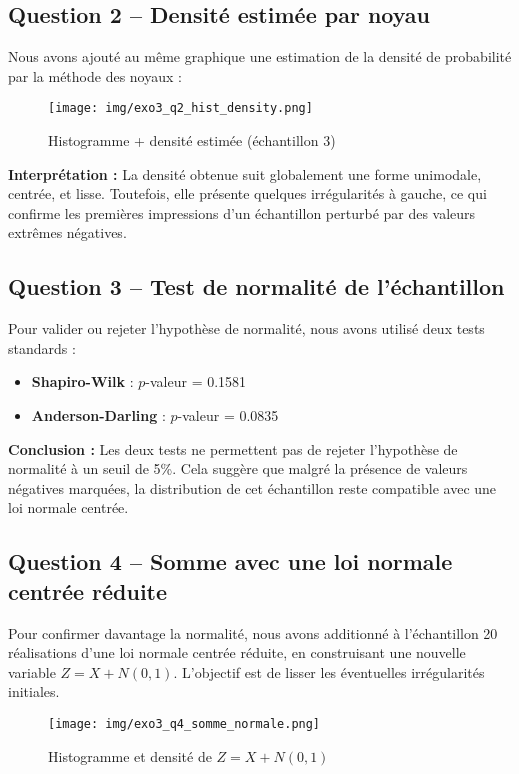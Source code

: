 \documentclass[a4paper,11pt]{article}
\begin{document}
\subsection*{Question 2 – Densité estimée par noyau}
Nous avons ajouté au même graphique une estimation de la densité de probabilité par la méthode des noyaux :

\begin{figure}[H]
    \centering
    \texttt{[image: img/exo3\_q2\_hist\_density.png]}
    \caption{Histogramme + densité estimée (échantillon 3)}
\end{figure}

\textbf{Interprétation :} La densité obtenue suit globalement une forme unimodale, centrée, et lisse. Toutefois, elle présente quelques irrégularités à gauche, ce qui confirme les premières impressions d’un échantillon perturbé par des valeurs extrêmes négatives.

\subsection*{Question 3 – Test de normalité de l’échantillon}
Pour valider ou rejeter l’hypothèse de normalité, nous avons utilisé deux tests standards :

\begin{itemize}
    \item \textbf{Shapiro-Wilk} : $p$-valeur = 0.1581
    \item \textbf{Anderson-Darling} : $p$-valeur = 0.0835
\end{itemize}

\textbf{Conclusion :} Les deux tests ne permettent pas de rejeter l’hypothèse de normalité à un seuil de 5\%. Cela suggère que malgré la présence de valeurs négatives marquées, la distribution de cet échantillon reste compatible avec une loi normale centrée.

\subsection*{Question 4 – Somme avec une loi normale centrée réduite}
Pour confirmer davantage la normalité, nous avons additionné à l’échantillon 20 réalisations d’une loi normale centrée réduite, en construisant une nouvelle variable $Z = X + N(0,1)$. L’objectif est de lisser les éventuelles irrégularités initiales.

\begin{figure}[H]
    \centering
    \texttt{[image: img/exo3\_q4\_somme\_normale.png]}
    \caption{Histogramme et densité de $Z = X + N(0,1)$}
\end{figure}
\end{document}
